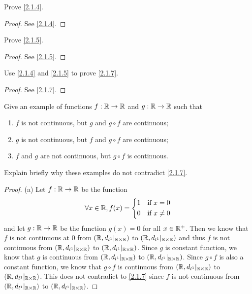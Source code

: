 \exercisesection

\begin{ex}\label{ex:2.1.1}
  Prove \cref{2.1.4}.
\end{ex}

\begin{proof}
  See \cref{2.1.4}.
\end{proof}

\begin{ex}\label{ex:2.1.2}
  Prove \cref{2.1.5}.
\end{ex}

\begin{proof}
  See \cref{2.1.5}.
\end{proof}

\begin{ex}\label{ex:2.1.3}
  Use \cref{2.1.4} and \cref{2.1.5} to prove \cref{2.1.7}.
\end{ex}

\begin{proof}
  See \cref{2.1.7}.
\end{proof}

\begin{ex}\label{ex:2.1.4}
  Give an example of functions \(f : \mathbb{R} \to \mathbb{R}\) and \(g : \mathbb{R} \to \mathbb{R}\) such that
  \begin{enumerate}
    \item \(f\) is not continuous, but \(g\) and \(g \circ f\) are continuous;
    \item \(g\) is not continuous, but \(f\) and \(g \circ f\) are continuous;
    \item \(f\) and \(g\) are not continuous, but \(g \circ f\) is continuous.
  \end{enumerate}
  Explain briefly why these examples do not contradict \cref{2.1.7}.
\end{ex}

\begin{proof}{(a)}
  Let \(f : \mathbb{R} \to \mathbb{R}\) be the function
  \[
    \forall x \in \mathbb{R}, f(x) = \begin{dcases}
      1 & \text{if } x = 0    \\
      0 & \text{if } x \neq 0
    \end{dcases}
  \]
  and let \(g : \mathbb{R} \to \mathbb{R}\) be the function \(g(x) = 0\) for all \(x \in \mathbb{R}^+\).
  Then we know that \(f\) is not continuous at \(0\) from \((\mathbb{R}, d_{l^1}|_{\mathbb{R} \times \mathbb{R}})\) to \((\mathbb{R}, d_{l^1}|_{\mathbb{R} \times \mathbb{R}})\) and thus \(f\) is not continuous from \((\mathbb{R}, d_{l^1}|_{\mathbb{R} \times \mathbb{R}})\) to \((\mathbb{R}, d_{l^1}|_{\mathbb{R} \times \mathbb{R}})\).
  Since \(g\) is constant function, we know that \(g\) is continuous from \((\mathbb{R}, d_{l^1}|_{\mathbb{R} \times \mathbb{R}})\) to \((\mathbb{R}, d_{l^1}|_{\mathbb{R} \times \mathbb{R}})\).
  Since \(g \circ f\) is also a constant function, we know that \(g \circ f\) is continuous from \((\mathbb{R}, d_{l^1}|_{\mathbb{R} \times \mathbb{R}})\) to \((\mathbb{R}, d_{l^1}|_{\mathbb{R} \times \mathbb{R}})\).
  This does not contradict to \cref{2.1.7} since \(f\) is not continuous from \((\mathbb{R}, d_{l^1}|_{\mathbb{R} \times \mathbb{R}})\) to \((\mathbb{R}, d_{l^1}|_{\mathbb{R} \times \mathbb{R}})\).
\end{proof}

